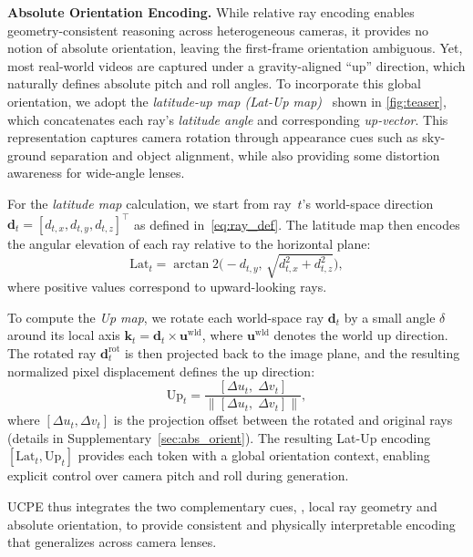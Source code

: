 

\noindent\textbf{Absolute Orientation Encoding.}
While relative ray encoding enables geometry-consistent reasoning across heterogeneous cameras, it provides no notion of absolute orientation, leaving the first-frame orientation ambiguous.
Yet, most real-world videos are captured under a gravity-aligned ``up'' direction, which naturally defines absolute pitch and roll angles.
To incorporate this global orientation, we adopt the \emph{latitude-up map (Lat-Up map)}~\cite{jin2023perspective,veicht2024geocalib,bernal2025precisecam} shown in \cref{fig:teaser}, which concatenates each ray's \emph{latitude angle} and corresponding \emph{up-vector}.
This representation captures camera rotation through appearance cues such as sky-ground separation and object alignment, while also providing some distortion awareness for wide-angle lenses.

For the \emph{latitude map} calculation, we start from ray~\(t\)'s world-space direction \(\bm{d}_t = [d_{t,x}, d_{t,y}, d_{t,z}]^\top\) as defined in~\cref{eq:ray_def}.
The latitude map then encodes the angular elevation of each ray relative to the horizontal plane:
\begin{equation}
\text{Lat}_t = \arctan2 \big(-d_{t,y},\, \sqrt{d_{t,x}^{2} + d_{t,z}^{2}}\big),
\label{eq:latmap}
\end{equation}
where positive values correspond to upward-looking rays.

To compute the \emph{Up map}, we rotate each world-space ray \(\mathbf{d}_t\) by a small angle \(\delta\) around its local axis \(\bm{k}_t = \bm{d}_t \times \bm{u}^{\textrm{wld}}\),
where \(\bm{u}^{\textrm{wld}}\) denotes the world up direction.
The rotated ray \(\bm{d}^{\textrm{rot}}_t\) is then projected back to the image plane, and the resulting normalized pixel displacement defines the up direction:
\begin{equation}
\text{Up}_t =
\frac{[\Delta u_t,\; \Delta v_t]}{\|[\Delta u_t,\; \Delta v_t]\|},
\label{eq:upmap}
\end{equation}
where \([\Delta u_t,\Delta v_t]\) is the projection offset between the rotated and original rays (details in Supplementary~\cref{sec:abs_orient}).
The resulting Lat-Up encoding \([\text{Lat}_t, \text{Up}_t]\) provides each token with a global orientation context, enabling explicit control over camera pitch and roll during generation.

UCPE thus integrates the two complementary cues, \ie, local ray geometry and absolute orientation, to provide consistent and physically interpretable encoding that generalizes 
across camera lenses.

